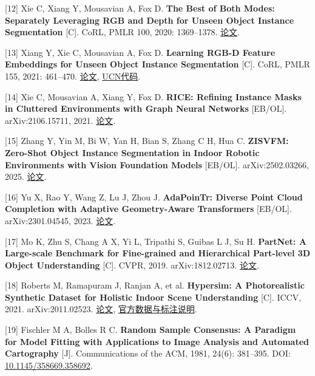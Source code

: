 \documentclass[UTF8,fontset=fandol]{ctexart}
\begin{document}
[12] Xie C, Xiang Y, Mousavian A, Fox D. \textbf{The Best of Both Modes: Separately Leveraging RGB and Depth for Unseen Object Instance Segmentation} [C]. CoRL, PMLR 100, 2020: 1369–1378. \href{https://proceedings.mlr.press/v100/xie20b.html}{论文}.



[13] Xiang Y, Xie C, Mousavian A, Fox D. \textbf{Learning RGB-D Feature Embeddings for Unseen Object Instance Segmentation} [C]. CoRL, PMLR 155, 2021: 461–470. \href{https://proceedings.mlr.press/v155/xiang21a.html}{论文}, \href{https://github.com/NVlabs/UnseenObjectClustering}{UCN代码}.



[14] Xie C, Mousavian A, Xiang Y, Fox D. \textbf{RICE: Refining Instance Masks in Cluttered Environments with Graph Neural Networks} [EB/OL]. arXiv:2106.15711, 2021. \href{https://arxiv.org/abs/2106.15711}{论文}.



[15] Zhang Y, Yin M, Bi W, Yan H, Bian S, Zhang C H, Hua C. \textbf{ZISVFM: Zero-Shot Object Instance Segmentation in Indoor Robotic Environments with Vision Foundation Models} [EB/OL]. arXiv:2502.03266, 2025. \href{https://arxiv.org/abs/2502.03266}{论文}.



[16] Yu X, Rao Y, Wang Z, Lu J, Zhou J. \textbf{AdaPoinTr: Diverse Point Cloud Completion with Adaptive Geometry-Aware Transformers} [EB/OL]. arXiv:2301.04545, 2023. \href{https://arxiv.org/abs/2301.04545}{论文}.



[17] Mo K, Zhu S, Chang A X, Yi L, Tripathi S, Guibas L J, Su H. \textbf{PartNet: A Large-scale Benchmark for Fine-grained and Hierarchical Part-level 3D Object Understanding} [C]. CVPR, 2019. arXiv:1812.02713. \href{https://arxiv.org/abs/1812.02713}{论文}.



[18] Roberts M, Ramapuram J, Ranjan A, et al. \textbf{Hypersim: A Photorealistic Synthetic Dataset for Holistic Indoor Scene Understanding} [C]. ICCV, 2021. arXiv:2011.02523. \href{https://arxiv.org/abs/2011.02523}{论文}, \href{https://github.com/apple/ml-hypersim}{官方数据与标注说明}.



[19] Fischler M A, Bolles R C. \textbf{Random Sample Consensus: A Paradigm for Model Fitting with Applications to Image Analysis and Automated Cartography} [J]. Communications of the ACM, 1981, 24(6): 381–395. DOI: \href{https://doi.org/10.1145/358669.358692}{10.1145/358669.358692}.
\end{document}
